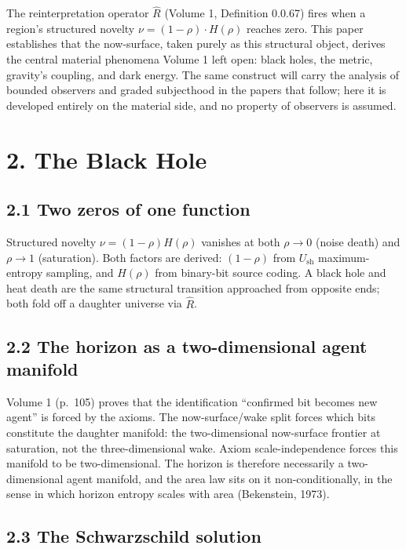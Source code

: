 \documentclass[11pt,oneside]{report}
\theoremstyle{definition}
\theoremstyle{remark}
\begin{document}
The reinterpretation operator \ensuremath{\hat{R}} (Volume 1, Definition
0.0.67) fires when a region's structured novelty \ensuremath{\nu =
(1-\rho)\cdot H(\rho)} reaches zero. This paper establishes that the
now-surface, taken purely as this structural object, derives the central
material phenomena Volume 1 left open: black holes, the metric, gravity's
coupling, and dark energy. The same construct will carry the analysis of
bounded observers and graded subjecthood in the papers that follow; here
it is developed entirely on the material side, and no property of
observers is assumed.

\section*{2. The Black Hole}

\subsection*{2.1 Two zeros of one function}

Structured novelty \ensuremath{\nu = (1-\rho)H(\rho)} vanishes at both
\ensuremath{\rho \to 0} (noise death) and \ensuremath{\rho \to 1}
(saturation). Both factors are derived: \ensuremath{(1-\rho)} from
\ensuremath{U_{\mathrm{sh}}} maximum-entropy sampling, and
\ensuremath{H(\rho)} from binary-bit source coding. A black hole and heat
death are the same structural transition approached from opposite ends;
both fold off a daughter universe via \ensuremath{\hat{R}}.

\subsection*{2.2 The horizon as a two-dimensional agent manifold}

Volume 1 (p.~105) proves that the identification ``confirmed bit becomes
new agent'' is forced by the axioms. The now-surface/wake split forces
which bits constitute the daughter manifold: the two-dimensional
now-surface frontier at saturation, not the three-dimensional wake. Axiom
scale-independence forces this manifold to be two-dimensional. The
horizon is therefore necessarily a two-dimensional agent manifold, and
the area law sits on it non-conditionally, in the sense in which horizon
entropy scales with area (Bekenstein, 1973).

\subsection*{2.3 The Schwarzschild solution}
\end{document}
